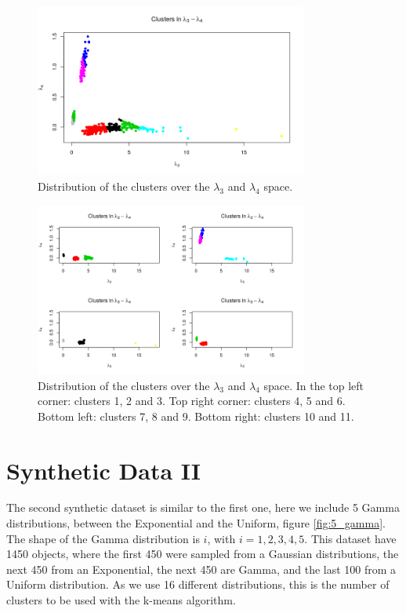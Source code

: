\begin{figure}[H]
    \centering
    \includegraphics[width=0.8\textwidth]{img/gld_clustering/Dataset1/l3_l4/l3_l4.png}
    \caption{Distribution of the clusters over the $\lambda_{3}$ and $\lambda_{4}$ space.}
    \label{fig:dataset1_l3l4_l3_l4}
\end{figure}

\begin{figure}[H]
    \centering
    \includegraphics[width=0.8\textwidth]{img/gld_clustering/Dataset1/l3_l4/l3_l4_dividido.png}
    \caption{Distribution of the clusters over the $\lambda_{3}$ and $\lambda_{4}$ space. In the top left corner: clusters 1, 2 and 3. Top right corner: clusters 4, 5 and 6. Bottom left: clusters 7, 8 and 9. Bottom right: clusters 10 and 11.}
    \label{fig:dataset1_l3l4_l3_l4_dividido}
\end{figure}


\section{Synthetic Data II}\label{sec:synthetic_II}
The second synthetic dataset is similar to the first one, here we include 5 Gamma distributions, between the Exponential and the Uniform, figure \ref{fig:5_gamma}. The shape of the Gamma distribution is $i$, with $i=1, 2, 3, 4, 5$. This dataset have 1450 objects, where the first 450 were sampled from a Gaussian distributions, the next 450 from an Exponential, the next 450 are Gamma, and the last 100 from a Uniform distribution. As we use 16 different distributions, this is the number of clusters to be used with the k-means algorithm. 

